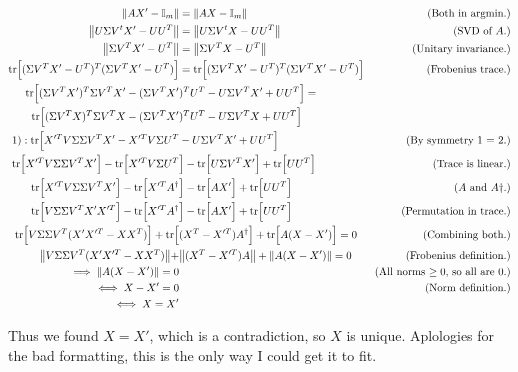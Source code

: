 \begin{solution}
{\small
    \alignbreak
    \begin{align}
        \norm{AX' - \mathbb{I}_m} &= \norm{AX - \mathbb{I}_m} &\text{(Both in argmin.)}\nonumber\\
        \norm{U\Sigma V^t X' - UU^T} &= \norm{U\Sigma V^t X - UU^T} &\text{(SVD of $A$.)}\nonumber\\
        \norm{\Sigma V^TX' - U^T} &= \norm{\Sigma V^TX - U^T} &\text{(Unitary invariance.)}\nonumber\\
        \text{tr} \Big[ (\Sigma V^TX' - U^T)^T(\Sigma V^TX' - U^T)\Big] &= \text{tr} \Big[ (\Sigma V^TX' - U^T)^T(\Sigma V^TX' - U^T)\Big] &\text{(Frobenius trace.)}\nonumber\\
        \text{tr} \Big[ (\Sigma V^TX')^T\Sigma V^TX' - (\Sigma V^TX'&)^TU^T - U\Sigma V^TX' + UU^T\Big] =\\
        \text{tr} \Big[ (\Sigma V^TX)^T\Sigma V^TX - (\Sigma V^TX'&)^TU^T - U\Sigma V^TX + UU^T\Big]\\
        1): \text{tr} \Big[ X'^TV\Sigma \Sigma V^TX' - X'^TV\Sigma U^T& - U\Sigma V^TX' + UU^T\Big] &\text{(By symmetry 1 = 2.)}\nonumber\\
        \text{tr} \Big[ X'^TV\Sigma \Sigma V^TX'\Big] - \text{tr} \Big[ X'^TV\Sigma U^T& \Big]- \text{tr} \Big[ U\Sigma V^TX'\Big] + \text{tr} \Big[UU^T\Big] &\text{(Trace is linear.)}\nonumber\\
        \text{tr} \Big[ X'^TV\Sigma \Sigma V^TX'\Big] - \text{tr} \Big[ X'^TA^\dag& \Big]- \text{tr} \Big[ AX'\Big] + \text{tr} \Big[UU^T\Big] &\text{($A$ and $A\dag$.)}\nonumber\\
        \text{tr} \Big[ V\Sigma \Sigma V^TX'X'^T\Big] - \text{tr} \Big[ X'^TA^\dag& \Big]- \text{tr} \Big[ AX'\Big] + \text{tr} \Big[UU^T\Big] &\text{(Permutation in trace.)}\nonumber\\
        \text{tr} \Big[ V\Sigma \Sigma V^T(X'X'^T - XX^T)\Big] + \text{tr} \Big[& (X^T - X'^T)A^\dag \Big] + \text{tr} \Big[ A(X - X')\Big] = 0 &\text{(Combining both.)}\nonumber\\
        \norm{V\Sigma \Sigma V^T(X'X'^T - XX^T)} + &\norm{(X^T - X'^T)A} + \norm{A(X - X')} = 0 &\text{(Frobenius definition.)}\nonumber\\
        \implies \norm{A(X - X')} = 0 &&\text{(All norms $\geq 0$, so all are 0.)}\nonumber\\
        \iff X - X' = 0 &&\text{(Norm definition.)}\nonumber\\
        \iff X = X'\nonumber
    \end{align}
    \alignbreak

}%
    Thus we found $X = X'$, which is a contradiction, so $X$ is unique. Aplologies for the bad formatting, this is the only way I could get it to fit.
\end{solution}

